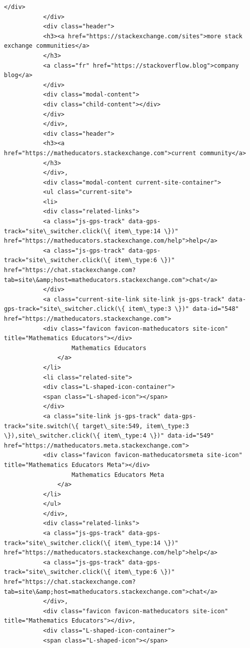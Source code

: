 \documentclass[11pt]{article}
\begin{document}
\begin{Verbatim}[commandchars=\\\{\}]
                           </div>
           </div>
           <div class="header">
           <h3><a href="https://stackexchange.com/sites">more stack exchange communities</a>
           </h3>
           <a class="fr" href="https://stackoverflow.blog">company blog</a>
           </div>
           <div class="modal-content">
           <div class="child-content"></div>
           </div>
           </div>,
           <div class="header">
           <h3><a href="https://matheducators.stackexchange.com">current community</a>
           </h3>
           </div>,
           <div class="modal-content current-site-container">
           <ul class="current-site">
           <li>
           <div class="related-links">
           <a class="js-gps-track" data-gps-track="site\_switcher.click(\{ item\_type:14 \})" href="https://matheducators.stackexchange.com/help">help</a>
           <a class="js-gps-track" data-gps-track="site\_switcher.click(\{ item\_type:6 \})" href="https://chat.stackexchange.com?tab=site\&amp;host=matheducators.stackexchange.com">chat</a>
           </div>
           <a class="current-site-link site-link js-gps-track" data-gps-track="site\_switcher.click(\{ item\_type:3 \})" data-id="548" href="https://matheducators.stackexchange.com">
           <div class="favicon favicon-matheducators site-icon" title="Mathematics Educators"></div>
                   Mathematics Educators
               </a>
           </li>
           <li class="related-site">
           <div class="L-shaped-icon-container">
           <span class="L-shaped-icon"></span>
           </div>
           <a class="site-link js-gps-track" data-gps-track="site.switch(\{ target\_site:549, item\_type:3 \}),site\_switcher.click(\{ item\_type:4 \})" data-id="549" href="https://matheducators.meta.stackexchange.com">
           <div class="favicon favicon-matheducatorsmeta site-icon" title="Mathematics Educators Meta"></div>
                   Mathematics Educators Meta
               </a>
           </li>
           </ul>
           </div>,
           <div class="related-links">
           <a class="js-gps-track" data-gps-track="site\_switcher.click(\{ item\_type:14 \})" href="https://matheducators.stackexchange.com/help">help</a>
           <a class="js-gps-track" data-gps-track="site\_switcher.click(\{ item\_type:6 \})" href="https://chat.stackexchange.com?tab=site\&amp;host=matheducators.stackexchange.com">chat</a>
           </div>,
           <div class="favicon favicon-matheducators site-icon" title="Mathematics Educators"></div>,
           <div class="L-shaped-icon-container">
           <span class="L-shaped-icon"></span>

\end{Verbatim}
\end{document}
